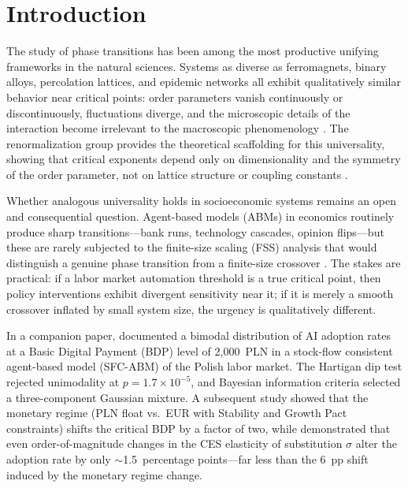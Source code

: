 \documentclass[12pt,a4paper]{article}
\begin{document}
\newpage
\tableofcontents
\newpage

\section{Introduction}
\label{sec:intro}

The study of phase transitions has been among the most productive unifying
frameworks in the natural sciences. Systems as diverse as ferromagnets, binary
alloys, percolation lattices, and epidemic networks all exhibit qualitatively
similar behavior near critical points: order parameters vanish continuously or
discontinuously, fluctuations diverge, and the microscopic details of the
interaction become irrelevant to the macroscopic phenomenology
\parencite{Stanley1971}. The renormalization group provides the theoretical
scaffolding for this universality, showing that critical exponents depend only
on dimensionality and the symmetry of the order parameter, not on lattice
structure or coupling constants \parencite{Fisher1998}.

Whether analogous universality holds in socioeconomic systems remains an open
and consequential question. Agent-based models (ABMs) in economics routinely
produce sharp transitions---bank runs, technology cascades, opinion
flips---but these are rarely subjected to the finite-size scaling (FSS)
analysis that would distinguish a genuine phase transition from a finite-size
crossover \parencite{Castellano2009}. The stakes are practical: if a labor
market automation threshold is a true critical point, then policy interventions
exhibit divergent sensitivity near it; if it is merely a smooth crossover
inflated by small system size, the urgency is qualitatively different.

In a companion paper, \textcite{Maciaszek2026a} documented a bimodal
distribution of AI adoption rates at a Basic Digital Payment (BDP) level of
2{,}000~PLN in a stock-flow consistent agent-based model (SFC-ABM) of the
Polish labor market. The Hartigan dip test rejected unimodality at $p =
1.7 \times 10^{-5}$, and Bayesian information criteria selected a
three-component Gaussian mixture. A subsequent study \parencite{Maciaszek2026b}
showed that the monetary regime (PLN float vs.\ EUR with Stability and Growth
Pact constraints) shifts the critical BDP by a factor of two, while
\textcite{Maciaszek2026c} demonstrated that even order-of-magnitude changes in
the CES elasticity of substitution $\sigma$ alter the adoption rate by only
$\sim$1.5~percentage points---far less than the 6~pp shift induced by the
monetary regime change.
\end{document}
